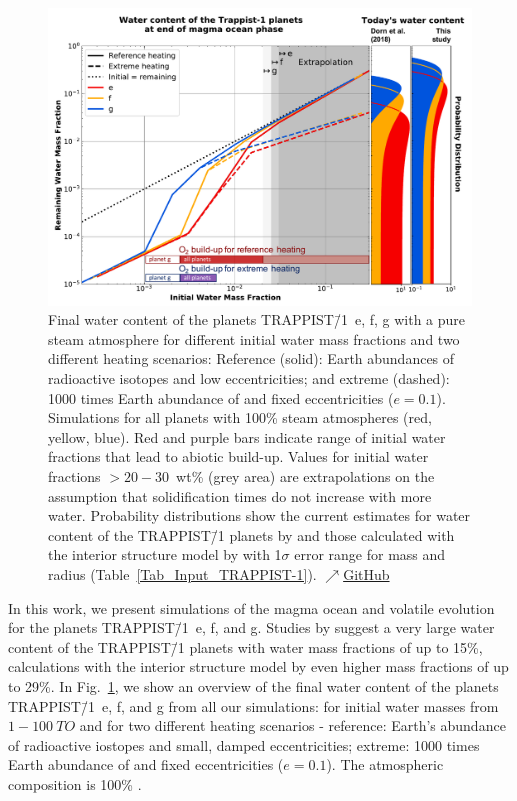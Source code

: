 \documentclass[oneside,twocolumn]{article}
\begin{document}
\begin{figure}[ht]
    \centering
    \includegraphics[width=\textwidth]{BarthFig9.pdf}
    \caption{Final water content of the planets TRAPPIST\=/1~e, f, g with a pure steam atmosphere for different initial water mass fractions and two different heating scenarios: Reference (solid): Earth abundances of radioactive isotopes and low eccentricities; and extreme (dashed): 1000 times Earth abundance of  and fixed eccentricities ($e=0.1$). Simulations for all planets with 100\% steam atmospheres (red, yellow, blue). Red and purple bars indicate range of initial water fractions that lead to abiotic  build-up. Values for initial water fractions $>20-30$~wt\% (grey area) are extrapolations on the assumption that solidification times do not increase with more water. Probability distributions show the current estimates for water content of the TRAPPIST\=/1 planets by \citet{Dorn2018} and those calculated with the interior structure model by \citet[this study]{Noack2016} with 1$\sigma$ error range for mass and radius (Table~\ref{Tab_Input_TRAPPIST-1}).
    \href{https://github.com/pbfeu/Trappist1_MagmOc/tree/public/Fig_Trappist1_FinalWater}{$\nearrow$GitHub}
    }
    \label{TR1_Results_Oxy}%
\end{figure}

In this work, we present simulations of the magma ocean and volatile evolution for the planets TRAPPIST\=/1~e, f, and g. 
Studies by \citet{Dorn2018} suggest a very large water content of the TRAPPIST\=/1 planets with water mass fractions of up to 15\%, calculations with the interior structure model by \citet{Noack2016} even higher mass fractions of up to 29\%. 
In Fig.~\ref{TR1_Results_Oxy}, we show an overview of the final water content of the planets TRAPPIST\=/1~e, f, and g from all our simulations:
for initial water masses from $1-\SI{100}{TO}$ and for two different heating scenarios - reference: Earth's abundance of radioactive iostopes and small, damped eccentricities; extreme: 1000 times Earth abundance of  and fixed eccentricities ($e=0.1$).
The atmospheric composition is 100\% .
\end{document}
